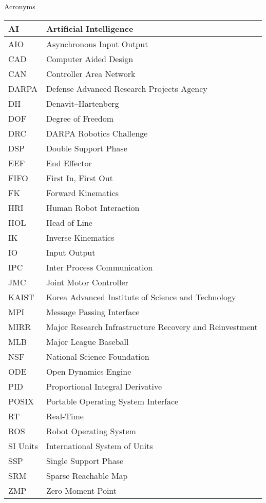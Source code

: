 \Large
\centering
Acronyms\\
\normalsize
\begin{longtable}{l | l}
\hline
AI & Artificial Intelligence\\
\hline
AIO & Asynchronous Input Output\\
\hline
CAD & Computer Aided Design\\
\hline
CAN & Controller Area Network \\
\hline
DARPA  &  Defense Advanced Research Projects Agency\\
\hline 
DH & Denavit–Hartenberg \\
\hline
DOF & Degree of Freedom \\
\hline
DRC  & DARPA Robotics Challenge \\
\hline
DSP & Double Support Phase\\
\hline
EEF  & End Effector\\
\hline
FIFO & First In, First Out\\
\hline
FK & Forward Kinematics\\
\hline
HRI & Human Robot Interaction\\
\hline
HOL & Head of Line\\
\hline
IK & Inverse Kinematics\\ 
\hline
IO & Input Output\\
\hline
IPC & Inter Process Communication \\
\hline
JMC & Joint Motor Controller\\
\hline
KAIST & Korea Advanced Institute of Science and Technology \\
\hline
MPI & Message Passing Interface\\
\hline
MIRR & Major Research Infrastructure Recovery and Reinvestment\\
\hline
MLB & Major League Baseball\\
\hline
NSF & National Science Foundation \\
\hline
ODE & Open Dynamics Engine\\
\hline
PID & Proportional Integral Derivative\\
\hline
POSIX & Portable Operating System Interface\\
\hline
RT & Real-Time\\
\hline
ROS & Robot Operating System\\
\hline
SI Units & International System of Units\\
\hline
SSP & Single Support Phase\\
\hline
SRM & Sparse Reachable Map \\
\hline 
ZMP & Zero Moment Point\\
\hline
\end{longtable}
